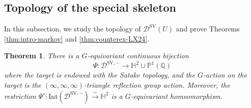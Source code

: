 \documentclass[reqno, 12pt]{amsart}
\newtheorem{thm}[prop]{Theorem}
\theoremstyle{definition}
\newcommand{\bP}{\mathbb{P}}
\newcommand{\bQ}{\mathbb{Q}}
\newcommand{\cD}{\mathcal{D}}
\newcommand{\SV}{\mathrm{SV}}
\newcommand{\bH}{\mathbb{H}}
\newcommand{\Int}{\mathrm{Int}}
\numberwithin{equation}{section}
\newcommand{\YL}[1]{{\textcolor{blue}{[Yuchen: #1]}}}
\begin{document}
\subsection{Topology of the special skeleton}
\label{sec:topology}
In this subsection, we study the topology of $\cD^{\SV}(U)$ and prove Theorems \ref{thm:intro-markov} and \ref{thm:counterex-LX24}.

\begin{thm}\label{thm:satake}
    There is a $G$-equivariant continuous bijection 
    \[
    \Psi: \cD^{\SV,-}\to \bH^2\cup \bP^1(\bQ)
    \]
    where the target is endowed with the Satake topology, and the $G$-action on the target is the $(\infty, \infty,\infty)$-triangle reflection group action. Moreover, the restriction $
\Psi^\circ:
\Int(\cD^{\SV,-})
\xrightarrow{\sim}
\bH^2$
is a $G$-equivariant homeomorphism.
\end{thm}
\end{document}
